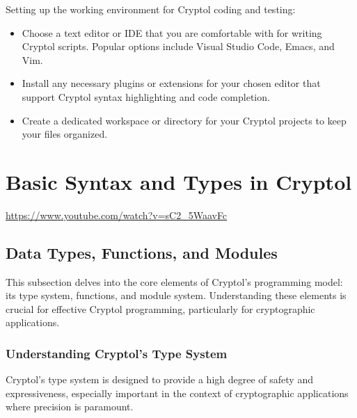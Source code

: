 Setting up the working environment for Cryptol coding and testing:
\begin{itemize}
	\item Choose a text editor or IDE that you are comfortable with for writing Cryptol scripts. Popular options include Visual Studio Code, Emacs, and Vim.
	\item Install any necessary plugins or extensions for your chosen editor that support Cryptol syntax highlighting and code completion.
	\item Create a dedicated workspace or directory for your Cryptol projects to keep your files organized.
\end{itemize}

\newpage
\section{Basic Syntax and Types in Cryptol}

\url{https://www.youtube.com/watch?v=sC2_5WaavFc}
\subsection{Data Types, Functions, and Modules}
This subsection delves into the core elements of Cryptol's programming model: its type system, functions, and module system. Understanding these elements is crucial for effective Cryptol programming, particularly for cryptographic applications.

\subsubsection{Understanding Cryptol's Type System}
Cryptol's type system is designed to provide a high degree of safety and expressiveness, especially important in the context of cryptographic applications where precision is paramount.

